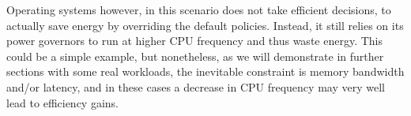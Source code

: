Operating systems however, in this scenario does not take efficient decisions, to actually save energy 
by overriding the default policies. Instead, it still relies on its power
governors to run at higher CPU frequency and thus waste energy. This could be a simple
example, but nonetheless, as we will demonstrate in further sections  with some real workloads, 
the inevitable constraint is memory bandwidth and/or latency, and in these cases a decrease in CPU frequency may very well lead to efficiency gains.



